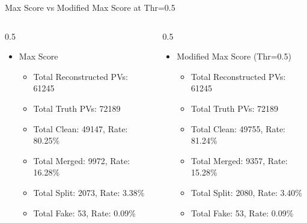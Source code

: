 \documentclass[xcolor=table,aspectratio=169]{beamer}
\begin{document}
\begin{frame}{Max Score vs Modified Max Score at Thr=0.5}
    \begin{columns}
        \begin{column}{0.5\linewidth}
            \begin{itemize}
                \item Max Score
                \begin{itemize}
                    \item Total Reconstructed PVs: 61245
                    \item Total Truth PVs: 72189
                    \item Total Clean: 49147, Rate: 80.25\%
                    \item Total Merged: 9972, Rate: 16.28\%
                    \item Total Split: 2073, Rate: 3.38\%
                    \item Total Fake: 53, Rate: 0.09\%
                \end{itemize}
            \end{itemize}
        \end{column}

        \begin{column}{0.5\linewidth}
            \begin{itemize}
                \item Modified Max Score (Thr=0.5)
                \begin{itemize}
                    \item Total Reconstructed PVs: 61245
                    \item Total Truth PVs: 72189
                    \item Total Clean: 49755, Rate: 81.24\%
                    \item Total Merged: 9357, Rate: 15.28\%
                    \item Total Split: 2080, Rate: 3.40\%
                    \item Total Fake: 53, Rate: 0.09\%
                \end{itemize}
            \end{itemize}
        \end{column}
    \end{columns}
\end{frame}
\end{document}
